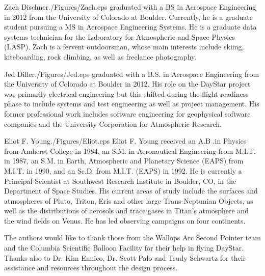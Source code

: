 \documentclass[twocolumn,letterpaper]{IEEEAerospace2012}
\newcommand{\rootdir}{./Figures/}
\begin{document}
\begin{biographywithpic}{Zach Dischner}{\rootdir Zach.eps}
graduated with a BS in Aerospace Engineering in 2012 from the University of Colorado at Boulder. Currently, he is a graduate student pursuing a MS in Aerospace Engineering Systems. He is a graduate data systems technician for the Laboratory for Atmospheric and Space Physics (LASP). Zach is a fervent outdoorsman, whose main interests include skiing, kiteboarding, rock climbing, as well as freelance photography.
\end{biographywithpic}

\begin{biographywithpic}{Jed Diller}{\rootdir Jed.eps}
graduated with a B.S. in Aerospace Engineering from the University of Colorado at Boulder in 2012. His role on the DayStar project was primarily electrical engineering but this shifted during the flight readiness phase to include systems and test engineering as well as project management. His former professional work includes software engineering for geophysical software companies and the University Corporation for Atmospheric Research.
\end{biographywithpic}

\begin{biographywithpic}{Eliot F. Young}{\rootdir Eliot.eps}
Eliot F. Young received an A.B .in Physics from Amherst College in 1984, an S.M. in Aeronautical Engineering from M.I.T. in 1987, an S.M. in Earth, Atmospheric and Planetary Science (EAPS) from M.I.T. in 1990, and an Sc.D. from M.I.T. (EAPS) in 1992. He is currently a Principal Scientist at Southwest Research Institute in Boulder, CO, in the Department of Space Studies. His current areas of study include the surfaces and atmospheres of Pluto, Triton, Eris and other large Trans-Neptunian Objects, as well as the distributions of aerosols and trace gases in Titan's atmosphere and the wind fields on Venus. He has led observing campaigns on four continents.
\end{biographywithpic}

\acknowledgments
The authors would like to thank those from the Wallops Arc Second Pointer team and the Columbia Scientific Balloon Facility for their help in flying DayStar. Thanks also to Dr. Kim Ennico, Dr. Scott Palo and Trudy Schwartz for their assistance and resources throughout the design process.
\end{document}
